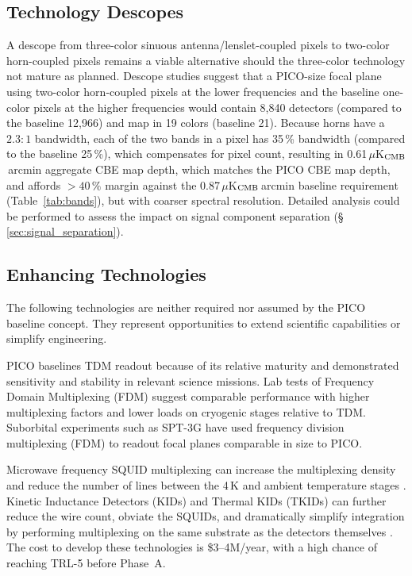 



\subsection{Technology Descopes}
\label{sec:technology_descopes} %

A descope from three-color sinuous antenna/lenslet-coupled pixels to two-color horn-coupled pixels remains a viable
alternative should the three-color technology not mature as
planned. Descope studies suggest that a PICO-size focal plane using
two-color horn-coupled pixels at the lower frequencies and the baseline one-color
pixels at the higher frequencies would contain 8,840 detectors
(compared to the baseline 12,966) and map in 19 colors (baseline
21). Because horns have a $2.3:1$ bandwidth, each of the two bands in
a pixel has 35\,\% bandwidth (compared to the baseline 25\,\%), which
compensates for pixel count, resulting in
0.61\,$\mu$K$_{\rm CMB}$\,arcmin aggregate CBE map depth, which
matches the PICO CBE map depth, and affords $>40\,\%$ margin against
the 0.87\,$\mu$K$_{\rm CMB}$\,arcmin baseline requirement
(Table~\ref{tab:bands}), but with coarser spectral resolution.
Detailed analysis could be performed to assess the impact on signal component separation (\S\,\ref{sec:signal_separation}).

\subsection{Enhancing Technologies}
\label{sec:enhancing_technologies} %

The following technologies are neither required nor assumed by the
PICO baseline concept. They represent opportunities to extend
scientific capabilities or simplify engineering.

PICO baselines TDM readout because of its relative maturity and
demonstrated sensitivity and stability in relevant science
missions. Lab tests of Frequency Domain Multiplexing (FDM) suggest
comparable performance with higher multiplexing factors and lower
loads on cryogenic stages relative to TDM. Suborbital experiments such
as SPT-3G have used frequency division multiplexing (FDM) to readout
focal planes comparable in size to PICO.

Microwave frequency SQUID multiplexing can increase the multiplexing
density and reduce the number of lines between the 4\,K and ambient
temperature stages \citep{Dober2017,Irwin2004}. Kinetic Inductance
Detectors (KIDs) and Thermal KIDs (TKIDs) can further reduce the wire
count, obviate the SQUIDs, and dramatically simplify integration by
performing multiplexing on the same substrate as the detectors
themselves \citep{McCarrick2016,Steinbach2018}. The cost to develop
these technologies is \$3--4M/year, with a high chance of reaching
TRL-5 before Phase~A.

